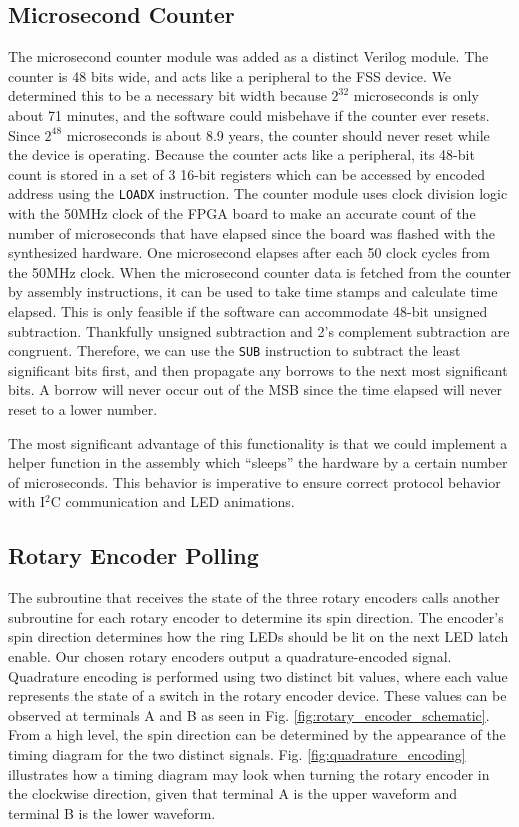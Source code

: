 \documentclass[conference]{IEEEtran}
\begin{document}
\subsection{Microsecond Counter}
The microsecond counter module was added as a distinct Verilog module. The counter is 48 bits wide, and acts like a peripheral to the FSS device. We determined this to be a necessary bit width because $2^{32}$ microseconds is only about 71 minutes, and the software could misbehave if the counter ever resets. Since $2^{48}$ microseconds is about 8.9 years, the counter should never reset while the device is operating. Because the counter acts like a peripheral, its 48-bit count is stored in a set of 3 16-bit registers which can be accessed by encoded address using the \verb|LOADX| instruction. The counter module uses clock division logic with the 50MHz clock of the FPGA board to make an accurate count of the number of microseconds that have elapsed since the board was flashed with the synthesized hardware. One microsecond elapses after each 50 clock cycles from the 50MHz clock. When the microsecond counter data is fetched from the counter by assembly instructions, it can be used to take time stamps and calculate time elapsed. This is only feasible if the software can accommodate 48-bit unsigned subtraction. Thankfully unsigned subtraction and 2's complement subtraction are congruent. Therefore, we can use the \verb|SUB| instruction to subtract the least significant bits first, and then propagate any borrows to the next most significant bits. A borrow will never occur out of the MSB since the time elapsed will never reset to a lower number.

The most significant advantage of this functionality is that we could implement a helper function in the assembly which ``sleeps'' the hardware by a certain number of microseconds. This behavior is imperative to ensure correct protocol behavior with I$^2$C communication and LED animations.
\subsection{Rotary Encoder Polling}
The subroutine that receives the state of the three rotary encoders calls another subroutine for each rotary encoder to determine its spin direction. The encoder's spin direction determines how the ring LEDs should be lit on the next LED latch enable. Our chosen rotary encoders output a quadrature-encoded signal. Quadrature encoding is performed using two distinct bit values, where each value represents the state of a switch in the rotary encoder device. These values can be observed at terminals A and B as seen in Fig. \ref{fig:rotary_encoder_schematic}. From a high level, the spin direction can be determined by the appearance of the timing diagram for the two distinct signals. Fig. \ref{fig:quadrature_encoding} illustrates how a timing diagram may look when turning the rotary encoder in the clockwise direction, given that terminal A is the upper waveform and terminal B is the lower waveform.
\end{document}

